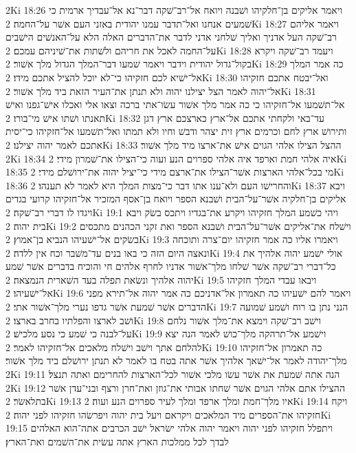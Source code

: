 2Ki 18:26  ויאמר אליקים בן־חלקיהו ושׁבנה ויואח אל־רב־שׁקה דבר־נא אל־עבדיך ארמית כי שׁמעים אנחנו ואל־תדבר עמנו יהודית באזני העם אשׁר על־החמה׃
2Ki 18:27  ויאמר אליהם רב־שׁקה העל אדניך ואליך שׁלחני אדני לדבר את־הדברים האלה הלא על־האנשׁים הישׁבים על־החמה לאכל את חריהם ולשׁתות את־שׁיניהם עמכם׃
2Ki 18:28  ויעמד רב־שׁקה ויקרא בקול־גדול יהודית וידבר ויאמר שׁמעו דבר־המלך הגדול מלך אשׁור׃
2Ki 18:29  כה אמר המלך אל־ישׁיא לכם חזקיהו כי־לא יוכל להציל אתכם מידו׃
2Ki 18:30  ואל־יבטח אתכם חזקיהו אל־יהוה לאמר הצל יצילנו יהוה ולא תנתן את־העיר הזאת ביד מלך אשׁור׃
2Ki 18:31  אל־תשׁמעו אל־חזקיהו כי כה אמר מלך אשׁור עשׂו־אתי ברכה וצאו אלי ואכלו אישׁ־גפנו ואישׁ תאנתו ושׁתו אישׁ מי־בורו׃
2Ki 18:32  עד־באי ולקחתי אתכם אל־ארץ כארצכם ארץ דגן ותירושׁ ארץ לחם וכרמים ארץ זית יצהר ודבשׁ וחיו ולא תמתו ואל־תשׁמעו אל־חזקיהו כי־יסית אתכם לאמר יהוה יצילנו׃
2Ki 18:33  ההצל הצילו אלהי הגוים אישׁ את־ארצו מיד מלך אשׁור׃
2Ki 18:34  איה אלהי חמת וארפד איה אלהי ספרוים הנע ועוה כי־הצילו את־שׁמרון מידי׃
2Ki 18:35  מי בכל־אלהי הארצות אשׁר־הצילו את־ארצם מידי כי־יציל יהוה את־ירושׁלם מידי׃
2Ki 18:36  והחרישׁו העם ולא־ענו אתו דבר כי־מצות המלך היא לאמר לא תענהו׃
2Ki 18:37  ויבא אליקים בן־חלקיה אשׁר־על־הבית ושׁבנא הספר ויואח בן־אסף המזכיר אל־חזקיהו קרועי בגדים ויגדו לו דברי רב־שׁקה׃
2Ki 19:1  ויהי כשׁמע המלך חזקיהו ויקרע את־בגדיו ויתכס בשׂק ויבא בית יהוה׃
2Ki 19:2  וישׁלח את־אליקים אשׁר־על־הבית ושׁבנא הספר ואת זקני הכהנים מתכסים בשׂקים אל־ישׁעיהו הנביא בן־אמוץ׃
2Ki 19:3  ויאמרו אליו כה אמר חזקיהו יום־צרה ותוכחה ונאצה היום הזה כי באו בנים עד־משׁבר וכח אין ללדה׃
2Ki 19:4  אולי ישׁמע יהוה אלהיך את כל־דברי רב־שׁקה אשׁר שׁלחו מלך־אשׁור אדניו לחרף אלהים חי והוכיח בדברים אשׁר שׁמע יהוה אלהיך ונשׂאת תפלה בעד השׁארית הנמצאה׃
2Ki 19:5  ויבאו עבדי המלך חזקיהו אל־ישׁעיהו׃
2Ki 19:6  ויאמר להם ישׁעיהו כה תאמרון אל־אדניכם כה אמר יהוה אל־תירא מפני הדברים אשׁר שׁמעת אשׁר גדפו נערי מלך־אשׁור אתי׃
2Ki 19:7  הנני נתן בו רוח ושׁמע שׁמועה ושׁב לארצו והפלתיו בחרב בארצו׃
2Ki 19:8  וישׁב רב־שׁקה וימצא את־מלך אשׁור נלחם על־לבנה כי שׁמע כי נסע מלכישׁ׃
2Ki 19:9  וישׁמע אל־תרהקה מלך־כושׁ לאמר הנה יצא להלחם אתך וישׁב וישׁלח מלאכים אל־חזקיהו לאמר׃
2Ki 19:10  כה תאמרון אל־חזקיהו מלך־יהודה לאמר אל־ישׁאך אלהיך אשׁר אתה בטח בו לאמר לא תנתן ירושׁלם ביד מלך אשׁור׃
2Ki 19:11  הנה אתה שׁמעת את אשׁר עשׂו מלכי אשׁור לכל־הארצות להחרימם ואתה תנצל׃
2Ki 19:12  ההצילו אתם אלהי הגוים אשׁר שׁחתו אבותי את־גוזן ואת־חרן ורצף ובני־עדן אשׁר בתלאשׂר׃
2Ki 19:13  איו מלך־חמת ומלך ארפד ומלך לעיר ספרוים הנע ועוה׃
2Ki 19:14  ויקח חזקיהו את־הספרים מיד המלאכים ויקראם ויעל בית יהוה ויפרשׂהו חזקיהו לפני יהוה׃
2Ki 19:15  ויתפלל חזקיהו לפני יהוה ויאמר יהוה אלהי ישׂראל ישׁב הכרבים אתה־הוא האלהים לבדך לכל ממלכות הארץ אתה עשׂית את־השׁמים ואת־הארץ׃
